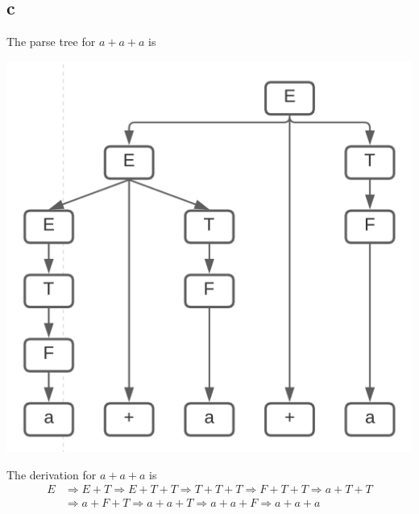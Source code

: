 \documentclass{article}
\begin{document}
\subsection*{c}
The parse tree for $a+a+a$ is
\begin{center}
    \includegraphics[scale=.65]{21c.png}
\end{center}
The derivation for $a+a+a$ is
\begin{align*}
    E &\Rightarrow E+T \Rightarrow E + T+ T \Rightarrow T+T+T \Rightarrow F + T + T \Rightarrow a + T + T \\
    & \Rightarrow a + F + T \Rightarrow a + a + T \Rightarrow a + a + F \Rightarrow a+a+a
\end{align*}

\pagebreak
\end{document}
